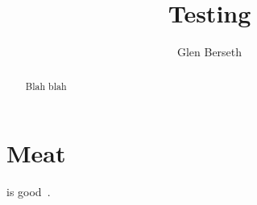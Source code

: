 \documentclass[]{article}
\title{Testing}
\author{Glen Berseth}
\begin{document}
\maketitle

\begin{abstract}
Blah blah
\end{abstract}

\section{Meat}

is good~\cite{taylor2009transfer}.




\end{document}
